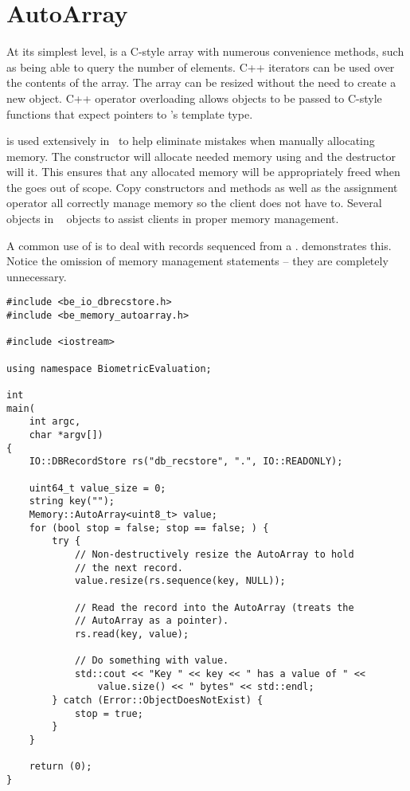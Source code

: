 \section{AutoArray}
\label{sec-autoarray}
At its simplest level,  is a C-style array with numerous convenience 
methods, such as being able to query the number of elements.  C++ iterators
can be used over the contents of the array.  The array can be resized without
the need to create a new object.  C++ operator overloading allows 
objects to be passed to C-style functions that expect pointers to 's
template type.

 is used extensively in \sname\ to help eliminate mistakes when
manually allocating memory.  The  constructor will allocate needed
memory using  and the destructor will  it.  This ensures
that any allocated memory will be appropriately freed when the  goes
out of scope.  Copy constructors and methods as well as the assignment operator
all correctly manage memory so the client does not have to.  Several objects in
\sname\   objects to assist clients in proper memory management.

A common use of  is to deal with records sequenced from a
.  demonstrates this.  Notice the
omission of memory management statements -- they are completely unnecessary.

\begin{lstlisting}[caption={Using \class{AutoArray}s with \class{RecordStore}s}, label=autoarrayrsuse]
#include <be_io_dbrecstore.h>
#include <be_memory_autoarray.h>

#include <iostream>

using namespace BiometricEvaluation;

int
main(
    int argc,
    char *argv[])
{
	IO::DBRecordStore rs("db_recstore", ".", IO::READONLY);

	uint64_t value_size = 0;
	string key("");
	Memory::AutoArray<uint8_t> value;
	for (bool stop = false; stop == false; ) {
		try {
			// Non-destructively resize the AutoArray to hold
			// the next record.
			value.resize(rs.sequence(key, NULL));

			// Read the record into the AutoArray (treats the
			// AutoArray as a pointer).
			rs.read(key, value);

			// Do something with value.
			std::cout << "Key " << key << " has a value of " <<
			    value.size() << " bytes" << std::endl;
		} catch (Error::ObjectDoesNotExist) {
			stop = true;
		}
	}

	return (0);
}
\end{lstlisting}

